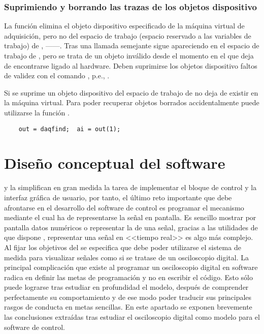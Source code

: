 \subsubsection{Suprimiendo y borrando las trazas de los objetos dispositivo}

La función  elimina el objeto dispositivo especificado de la
máquina virtual de adquisición, pero no del espacio de trabajo (espacio
reservado a las variables de trabajo) de \matlab{},
------. Tras una llamada semejante  sigue
apareciendo en el espacio de trabajo de \matlab{}, pero se trata de un
objeto inválido desde el momento en el que deja de encontrarse ligado al
hardware. Deben suprimirse los objetos dispositivo faltos de validez con el
comando , p.e., .

Si se suprime un objeto dispositivo del espacio de trabajo de \matlab{} no
deja de existir en la máquina virtual. Para poder recuperar objetos
borrados accidentalmente puede utilizarse la función .

\begin{lstlisting}
	out = daqfind;	ai = out(1);
\end{lstlisting}


\section{Diseño conceptual del software}

\matlab{} y la \datx{} simplifican en gran medida la tarea de implementar
el bloque de control y la interfaz gráfica de usuario, por tanto, el último
reto importante que debe afrontarse en el desarrollo del software de
control es programar el mecanismo mediante el cual ha de representarse la
señal en pantalla. Es sencillo mostrar por pantalla datos numéricos o
representar la  de una señal, gracias a las utilidades de que
dispone \matlab{}, representar una señal en <<tiempo real>> es algo más
complejo. Al fijar los objetivos del  se especifica que debe poder
utilizarse el sistema de medida para visualizar señales como si se tratase
de un osciloscopio digital. La principal complicación que existe al
programar un osciloscopio digital en software radica en definir las metas
de programación y no en escribir el código. Esto sólo puede lograrse tras
estudiar en profundidad el modelo, después de comprender perfectamente su
comportamiento y de ese modo poder traducir sus principales rasgos de
conducta en metas sencillas. En este apartado se exponen brevemente las
conclusiones extraídas tras estudiar el osciloscopio digital como modelo
para el software de control.


